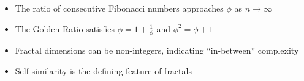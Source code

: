 \documentclass[11pt,a4paper]{article}
\begin{document}
\vspace{1cm}

\begin{tipbox}
\begin{itemize}[noitemsep]
    \item The ratio of consecutive Fibonacci numbers approaches $\phi$ as $n \to \infty$
    \item The Golden Ratio satisfies $\phi = 1 + \frac{1}{\phi}$ and $\phi^2 = \phi + 1$
    \item Fractal dimensions can be non-integers, indicating ``in-between'' complexity
    \item Self-similarity is the defining feature of fractals
\end{itemize}
\end{tipbox}
\end{document}
